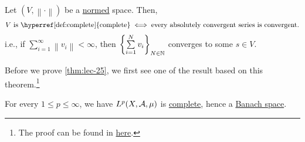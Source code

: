 \begin{theorem}\label{thm:lec-25}
	Let \((V, \left\lVert \cdot\right\rVert )\) be a \hyperref[def:norm]{normed} space. Then,
	\[
		\text{\(V\) is \hyperref[def:complete]{complete}} \iff \text{every absolutely convergent series is convergent}.
	\]
	i.e., if \(\sum\limits_{i=1}^{\infty} \left\lVert v_{i} \right\rVert<\infty\), then \(\left\{\sum\limits_{i=1}^{N} v_{i} \right\}_{N\in \mathbb{\MakeUppercase{n}} }\)
	converges to some \(s\in V\).
\end{theorem}
Before we prove \autoref{thm:lec-25}, we first see one of the result based on this theorem.\footnote{The proof can be found in \hyperref[pf:thm:lec25]{here}.}

\begin{theorem}\label{thm:Riesz-Fischer-theorem}
	For every \(1\leq p\leq \infty \), we have \(L^p(X, \mathcal{\MakeUppercase{a}} , \mu )\) is \hyperref[def:complete]{complete}, hence a
	\hyperref[def:Banach-space]{Banach space}.
\end{theorem}
